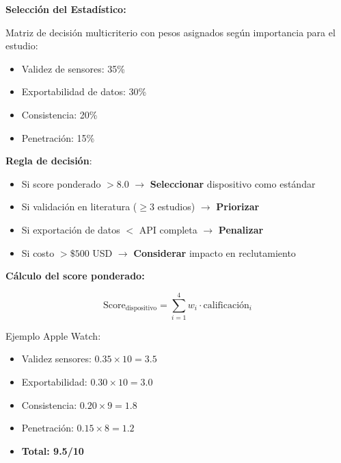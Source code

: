 \documentclass[12pt,letterpaper,twoside]{report}
\begin{document}
\begin{estadisticobox}
\textbf{Selección del Estadístico:}

Matriz de decisión multicriterio con pesos asignados según importancia para el estudio:
\begin{itemize}[noitemsep]
    \item Validez de sensores: 35\%
    \item Exportabilidad de datos: 30\%
    \item Consistencia: 20\%
    \item Penetración: 15\%
\end{itemize}
\end{estadisticobox}

\begin{reglabox}
\textbf{Regla de decisión}:

\begin{itemize}[noitemsep]
    \item Si score ponderado $> 8.0$ $\to$ \textbf{Seleccionar} dispositivo como estándar
    \item Si validación en literatura ($\geq 3$ estudios) $\to$ \textbf{Priorizar}
    \item Si exportación de datos $<$ API completa $\to$ \textbf{Penalizar}
    \item Si costo $> \$500$ USD $\to$ \textbf{Considerar} impacto en reclutamiento
\end{itemize}
\end{reglabox}

\begin{calculobox}
\textbf{Cálculo del score ponderado:}

\begin{equation}
\text{Score}_{\text{dispositivo}} = \sum_{i=1}^{4} w_i \cdot \text{calificación}_i
\end{equation}

Ejemplo Apple Watch:
\begin{itemize}[noitemsep]
    \item Validez sensores: $0.35 \times 10 = 3.5$
    \item Exportabilidad: $0.30 \times 10 = 3.0$
    \item Consistencia: $0.20 \times 9 = 1.8$
    \item Penetración: $0.15 \times 8 = 1.2$
    \item \textbf{Total: 9.5/10}
\end{itemize}
\end{calculobox}
\end{document}
